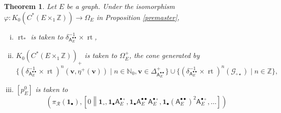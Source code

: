 \documentclass[12pt]{amsbook}%
\newcommand{\rt}{\operatorname{rt}}
\renewcommand{\phi}{\varphi}
\newtheorem{theor}{Theorem}[section]
\theoremstyle{defin}
\theoremstyle{remark}
\numberwithin{equation}{chapter}
\numberwithin{theor}{section}
\newcommand{\NN}{\mathbb{N}}
\newcommand{\ZZ}{\mathbb{Z}}
\newcommand{\singgen}{\mathcal G_{\circ\star}}
\newcommand{\oXe}[2]{\left[#1\left\|{#2}\right.\right]}
\newcommand{\regX}{{\bullet}}
\newcommand{\singX}{{\circ}}
\newcommand{\vv}{\mathbf{v}}
\newcommand{\uu}{\mathbf{1}}
\newcommand{\pK}[1]{\pi_{\mathcal R}(#1)}
\newcommand{\adjRR}{\mathsf{A}^{\bullet\bullet}}
\newcommand{\adjRS}{\mathsf{A}^{\bullet\circ}}
\newcommand{\nDT}{\Omega}
\begin{document}
\begin{theor}\label{DQmaster}
Let $E$ be a graph.  Under the isomorphism 
$
\phi:K_0( C^*(E \times_1 \ZZ))\to\nDT_E$
in Proposition \ref{premaster}, 
\begin{enumerate}[(i)]
\item $\rt_*$ is taken to $\delta_{\adjRR_E}^{-1}\times \rt$,
\item $K_0( C^*(E \times_1 \ZZ))_+$ is taken to $\nDT_E^+$, the cone generated by 
\[
\{(\delta_{\adjRR_E}^{-1}\times \rt)^n \left(\vv,\eta^+(\vv)\right)\mid n \in \NN_0, \vv\in \Delta_{\adjRR_E}^+\}\cup \{(\delta_{\adjRR_E}^{-1}\times \rt)^n(\singgen)\mid n\in\ZZ\}, 
\]
\item $[p_E^0]$ is taken to 
\[
\left(\pK{\uu_\regX },\oXe{0}{\uu_\singX,\uu_\regX \adjRS_E, \uu_\regX \adjRR_E \adjRS_E, \uu_\regX (\adjRR_E)^2 \adjRS_E,\dots}\right)
\]
\end{enumerate}
\end{theor}
\end{document}
